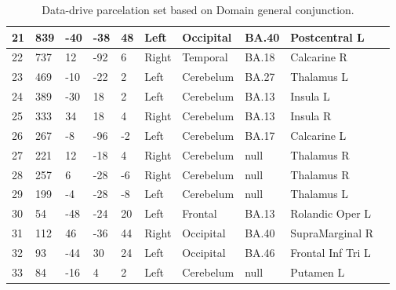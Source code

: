 \begin{table}
\begin{tabular}[0.2em]{@{}llllllllll@{}}
21 & 839 & -40 & -38 & 48 & Left & Occipital & BA.40 & Postcentral L \\\midrule
22 & 737 & 12 & -92 & 6 & Right & Temporal & BA.18 & Calcarine R \\\midrule
23 & 469 & -10 & -22 & 2 & Left & Cerebelum & BA.27 & Thalamus L \\\midrule
24 & 389 & -30 & 18 & 2 & Left & Cerebelum & BA.13 & Insula L \\\midrule
25 & 333 & 34 & 18 & 4 & Right & Cerebelum & BA.13 & Insula R \\\midrule
26 & 267 & -8 & -96 & -2 & Left & Cerebelum & BA.17 & Calcarine L \\\midrule
27 & 221 & 12 & -18 & 4 & Right & Cerebelum & null & Thalamus R \\\midrule
28 & 257 & 6 & -28 & -6 & Right & Cerebelum & null & Thalamus R \\\midrule
29 & 199 & -4 & -28 & -8 & Left & Cerebelum & null & Thalamus L \\\midrule
30 & 54 & -48 & -24 & 20 & Left & Frontal & BA.13 & Rolandic Oper L \\\midrule
31 & 112 & 46 & -36 & 44 & Right & Occipital & BA.40 & SupraMarginal R \\\midrule
32 & 93 & -44 & 30 & 24 & Left & Occipital & BA.46 & Frontal Inf Tri L \\\midrule
33 & 84 & -16 & 4 & 2 & Left & Cerebelum & null & Putamen L \\\bottomrule[0.2em]
\end{tabular}
\caption{Data-drive parcelation set based on Domain general conjunction.\label{tabel:DGset}}
\end{table}
